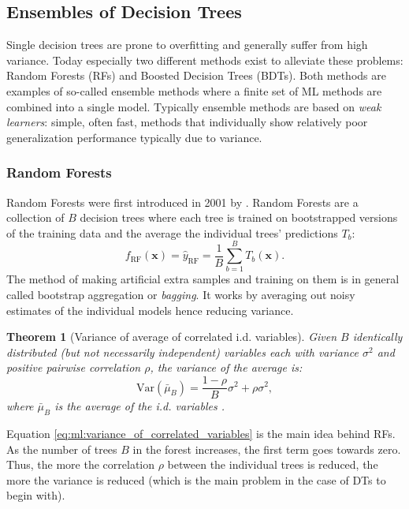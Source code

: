 \documentclass[a4paper, twoside, nobib]{tufte-book}
\newtheorem{theorem}{Theorem}
\newcommand{\autocite}[1]{\citep{#1}}
\renewcommand{\vec}[1]{\mathbf{#1}}
\begin{document}
\subsection{Ensembles of Decision Trees}
\label{subsec:ml:multiple_decision_trees}
Single decision trees are prone to overfitting and generally suffer from high variance. Today especially two different methods exist to alleviate these problems: Random Forests (RFs) and Boosted Decision Trees (BDTs). Both methods are examples of so-called ensemble methods where a finite set of ML methods are combined into a single model. Typically ensemble methods are based on \emph{weak learners}: simple, often fast, methods that individually show relatively poor generalization performance typically due to variance. 

\subsubsection{Random Forests}
\label{subsubsec:ml:random_forest}
Random Forests were first introduced in 2001 by \citet{breimanRandomForests2001}. Random Forests are a collection of $B$ decision trees where each tree is trained on bootstrapped versions of the training data and the average the individual trees' predictions $T_b$: 
\begin{equation}
  f_\mathrm{RF}(\vec{x}) = \hat{y}_\mathrm{RF} = \frac{1}{B}  \sum_{b=1}^B T_b(\vec{x}).
\end{equation}
The method of making artificial extra samples and training on them is in general called bootstrap aggregation or \emph{bagging}\autocite{hastieElementsStatisticalLearning2009}. It works by averaging out noisy estimates of the individual models hence reducing variance. 
\begin{theorem}[Variance of average of correlated i.d. variables]
  Given $B$ identically distributed (but not necessarily independent) variables each with variance $\sigma^2$ and positive pairwise correlation $\rho$, the variance of the average is:
  \begin{equation}
    \label{eq:ml:variance_of_correlated_variables}
    \mathrm{Var}(\bar{\mu}_B) = \frac{1-\rho}{B} \sigma^2 + \rho \sigma^2,
  \end{equation}
  where $\bar{\mu}_B$ is the average of the i.d. variables \autocite{hastieElementsStatisticalLearning2009}. %
\end{theorem}
Equation \eqref{eq:ml:variance_of_correlated_variables} is the main idea behind RFs. As the number of trees $B$ in the forest increases, the first term goes towards zero. Thus, the more the correlation $\rho$ between the individual trees is reduced, the more the variance is reduced (which is the main problem in the case of DTs to begin with). 
\end{document}

